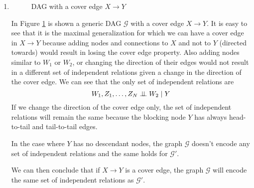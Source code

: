\documentclass{amsmlaj}
\begin{document}
\begin{sol}
	\begin{enumerate}
		\item
			\begin{figure}[H]
				\centering
				\caption{DAG with a cover edge $X \rightarrow Y$}
				\label{fig:cover}
			\end{figure}
			In Figure \ref{fig:cover} is shown a generic DAG
			$\mathcal{G}$ with a cover edge $X \rightarrow Y$. It is easy
			to see that it is the maximal generalization for which we can
			have a cover edge in $X \rightarrow Y$ because adding nodes
			and connections to $X$ and not to $Y$ (directed towards) would
			result in losing the cover edge property. Also adding nodes
			similar to $W_1$ or $W_2$, or changing the direction of their
			edges would not result in a different set of independent
			relations given a change in the direction of the cover edge.
			We can see that the only set of independent relations are
			\begin{equation}
				W_1,Z_1,\dots,Z_N \perp\!\!\!\perp W_2 \mid Y
			\end{equation}
			If we change the direction of the cover edge only, the set of independent
			relations will remain the same because the blocking node $Y$ has always
			head-to-tail and tail-to-tail edges.

			In the case where $Y$ has no descendant nodes, the graph
			$\mathcal{G}$ doesn't encode any set of independent relations and the same
			holds for $\mathcal{G}'$.

			We can then conclude that if $X \rightarrow Y$ is a cover edge, the graph
			$\mathcal{G}$ will encode the same set of independent relations as
			$\mathcal{G}'$.


\end{enumerate}
\end{sol}
\end{document}
